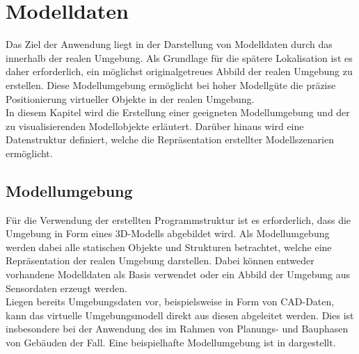 \chapter{Modelldaten\red[Datengrundlage]}
\label{chap.modeldata}

Das Ziel der Anwendung liegt in der Darstellung von Modelldaten durch das \kps{} innerhalb der realen Umgebung. Als Grundlage für die spätere Lokalisation ist es daher erforderlich, ein möglichst originalgetreues Abbild der realen Umgebung zu erstellen. Diese Modellumgebung ermöglicht bei hoher Modellgüte die präzise Positionierung virtueller Objekte in der realen Umgebung.\\
In diesem Kapitel wird die Erstellung einer geeigneten Modellumgebung und der zu visualisierenden Modellobjekte erläutert. Darüber hinaus wird eine Datenstruktur definiert, welche die Repräsentation erstellter Modellszenarien ermöglicht.


\section{Modellumgebung}
\label{chap.slam}
Für die Verwendung der erstellten Programmstruktur ist es erforderlich, dass die Umgebung in Form eines 3D-Modells abgebildet wird. Als Modellumgebung werden dabei alle statischen Objekte und Strukturen betrachtet, welche eine Repräsentation der realen Umgebung darstellen. Dabei können entweder vorhandene Modelldaten als Basis verwendet oder ein Abbild der Umgebung aus Sensordaten erzeugt werden.\\

Liegen bereits Umgebungsdaten vor, beispielsweise in Form von CAD-Daten, kann das virtuelle Umgebungsmodell direkt aus diesen abgeleitet werden. Dies ist insbesondere bei der Anwendung des  im Rahmen von Planungs- und Bauphasen von Gebäuden der Fall. Eine beispielhafte Modellumgebung ist in  dargestellt.\\

